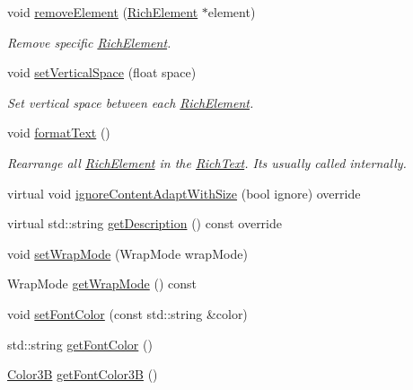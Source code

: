 \begin{DoxyCompactItemize}
void \hyperlink{classui_1_1RichText_a5db2f690c2dadc6ac6f5f0ef3f4ba55c}{remove\+Element} (\hyperlink{classui_1_1RichElement}{Rich\+Element} $\ast$element)
\begin{DoxyCompactList}\small\item\em Remove specific \hyperlink{classui_1_1RichElement}{Rich\+Element}. \end{DoxyCompactList}\item 
void \hyperlink{classui_1_1RichText_aa947b6c2404cc5b22d7794f5c601c069}{set\+Vertical\+Space} (float space)
\begin{DoxyCompactList}\small\item\em Set vertical space between each \hyperlink{classui_1_1RichElement}{Rich\+Element}. \end{DoxyCompactList}\item 
\mbox{\label{classui_1_1RichText_a01c63af976d602ca0d90dfe6ce885749}} 
void \hyperlink{classui_1_1RichText_a01c63af976d602ca0d90dfe6ce885749}{format\+Text} ()
\begin{DoxyCompactList}\small\item\em Rearrange all \hyperlink{classui_1_1RichElement}{Rich\+Element} in the \hyperlink{classui_1_1RichText}{Rich\+Text}. It\textquotesingle{}s usually called internally. \end{DoxyCompactList}\item 
virtual void \hyperlink{classui_1_1RichText_a82b3965a42f134415afab5605ef73ffa}{ignore\+Content\+Adapt\+With\+Size} (bool ignore) override
\item 
virtual std\+::string \hyperlink{classui_1_1RichText_aeae6c6fd1f11e9342ada2ef87dbf8681}{get\+Description} () const override
\item 
void \hyperlink{classui_1_1RichText_a19f13164d96c8c3374c394c59dce40f5}{set\+Wrap\+Mode} (Wrap\+Mode wrap\+Mode)
\item 
Wrap\+Mode \hyperlink{classui_1_1RichText_a20353e463ebf2676380e88cdf4143e07}{get\+Wrap\+Mode} () const
\item 
void \hyperlink{classui_1_1RichText_afed903a1b6a5c8f96615f22b644c2bbd}{set\+Font\+Color} (const std\+::string \&color)
\item 
std\+::string \hyperlink{classui_1_1RichText_aac64b7e3593e6723d51d514ee03dc0e4}{get\+Font\+Color} ()
\item 
\hyperlink{structColor3B}{Color3B} \hyperlink{classui_1_1RichText_a45c8e3ddbf180a6eb4f9912494f6e5a8}{get\+Font\+Color3B} ()
\item 

\end{DoxyCompactItemize}

